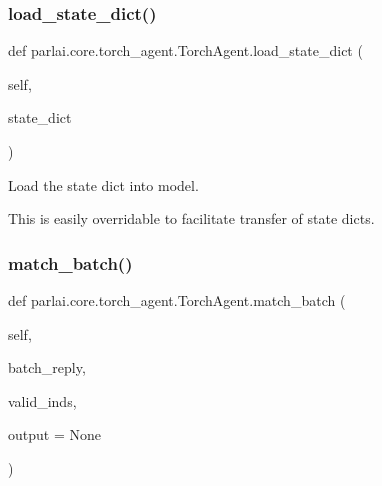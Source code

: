 \subsubsection{\texorpdfstring{load\+\_\+state\+\_\+dict()}{load\_state\_dict()}}
{\footnotesize\ttfamily def parlai.\+core.\+torch\+\_\+agent.\+Torch\+Agent.\+load\+\_\+state\+\_\+dict (\begin{DoxyParamCaption}\item[{}]{self,  }\item[{}]{state\+\_\+dict }\end{DoxyParamCaption})}

\begin{DoxyVerb}Load the state dict into model.

This is easily overridable to facilitate transfer of state dicts.
\end{DoxyVerb}
 \mbox{\label{classparlai_1_1core_1_1torch__agent_1_1TorchAgent_aba56b961d929e5c5b5da9cf8bd331502}} 
\subsubsection{\texorpdfstring{match\+\_\+batch()}{match\_batch()}}
{\footnotesize\ttfamily def parlai.\+core.\+torch\+\_\+agent.\+Torch\+Agent.\+match\+\_\+batch (\begin{DoxyParamCaption}\item[{}]{self,  }\item[{}]{batch\+\_\+reply,  }\item[{}]{valid\+\_\+inds,  }\item[{}]{output = {\ttfamily None} }\end{DoxyParamCaption})}


